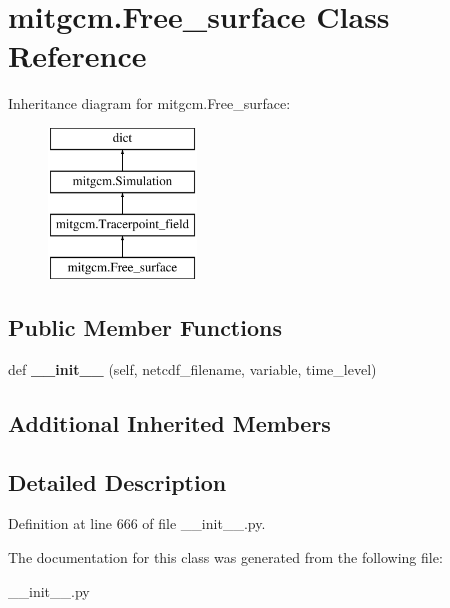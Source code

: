 \hypertarget{classmitgcm_1_1Free__surface}{}\section{mitgcm.\+Free\+\_\+surface Class Reference}
\label{classmitgcm_1_1Free__surface}
Inheritance diagram for mitgcm.\+Free\+\_\+surface\+:\begin{figure}[H]
\begin{center}
\leavevmode
\includegraphics[height=4.000000cm]{classmitgcm_1_1Free__surface}
\end{center}
\end{figure}
\subsection*{Public Member Functions}
\begin{DoxyCompactItemize}
\item 
\hypertarget{classmitgcm_1_1Free__surface_a907b133851b764478e123ef28951d9d6}{}def {\bfseries \+\_\+\+\_\+init\+\_\+\+\_\+} (self, netcdf\+\_\+filename, variable, time\+\_\+level)\label{classmitgcm_1_1Free__surface_a907b133851b764478e123ef28951d9d6}

\end{DoxyCompactItemize}
\subsection*{Additional Inherited Members}


\subsection{Detailed Description}


Definition at line 666 of file \+\_\+\+\_\+init\+\_\+\+\_\+.\+py.



The documentation for this class was generated from the following file\+:\begin{DoxyCompactItemize}
\item 
\+\_\+\+\_\+init\+\_\+\+\_\+.\+py\end{DoxyCompactItemize}
